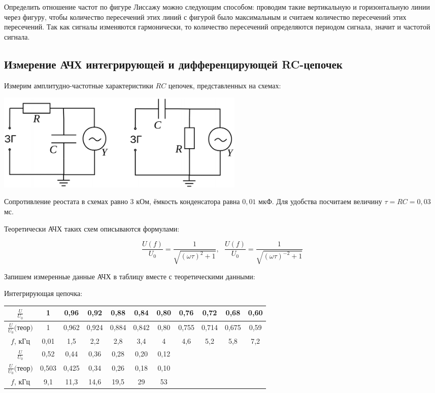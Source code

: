 \documentclass[a4paper, 12pt]{article} %
\begin{document}
Определить отношение частот по фигуре Лиссажу можно следующим способом: проводим такие вертикальную и горизонтальную линии через фигуру, чтобы количество пересечений этих линий с фигурой было максимальным и считаем количество пересечений этих пересечений. Так как сигналы изменяются гармонически, то количество пересечений определяются периодом сигнала, значит и частотой сигнала.\\

\text{ }

\subsection{Измерение АЧХ интегрирующей и дифференцирующей RC-цепочек}

Измерим амплитудно-частотные характеристики $RC$ цепочек, представленных на схемах:

\begin{center}
	\includegraphics[width=12cm]{12}
\end{center}

Сопротивление реостата в схемах равно $3$ кОм, ёмкость конденсатора равна $0,01$ мкФ. Для удобства посчитаем величину $\tau = RC = 0,03$ мс. 

Теоретически АЧХ таких схем описываются формулами:

\[\frac{U(f)}{U_0} = \frac{1}{\sqrt{(\omega \tau)^2 + 1}},\text{ } \frac{U(f)}{U_0} = \frac{1}{\sqrt{(\omega \tau)^{-2} + 1}}\]

Запишем измеренные данные АЧХ в таблицу вместе с теоретическими данными:

Интегрирующая цепочка:
\begin{center}
\begin{tabular}{|c|c|c|c|c|c|c|c|c|c|c|}
 \hline 
 $\frac{U}{U_0}$ & 1 & 0,96 & 0,92 & 0,88 & 0,84 & 0,80 & 0,76 & 0,72 & 0,68 & 0,60\\ 
 \hline 
 $\frac{U}{U_0} \text{(теор)}$ & 1 & 0,962 & 0,924 & 0,884 & 0,842 & 0,80 & 0,755 & 0,714 & 0,675 & 0,59\\
 \hline 
 $f$, кГц & 0,01 & 1,5 & 2,2 & 2,8 & 3,4 & 4 & 4,6 & 5,2 & 5,8 & 7,2 \\ 
 \hline 
 $\frac{U}{U_0}$  & 0,52 & 0,44 & 0,36 & 0,28 & 0,20 & 0,12 &&&&  \\ 
 \hline 
 $\frac{U}{U_0} \text{(теор)}$  & 0,503 & 0,425 & 0,34 & 0,26 & 0,18 & 0,10 &&&&  \\ 
 \hline 
 $f$, кГц & 9,1 & 11,3 & 14,6 & 19,5 & 29 & 53 &&&& \\ 
 \hline 
 \end{tabular}
 \end{center}
 
\end{document}
